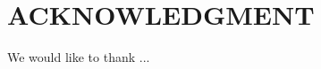 \documentclass[letterpaper, 10 pt, conference]{ieeeconf}  %
\begin{document}
\addtolength{\textheight}{-10cm}   %

\section*{ACKNOWLEDGMENT}

We would like to thank ... 


% 


\end{document}
